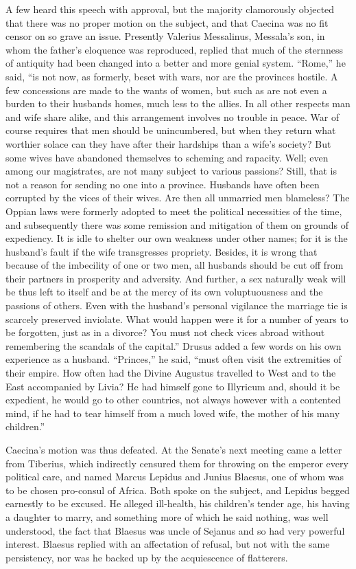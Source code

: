 A few heard this speech with approval, but the majority clamorously objected that there was no proper motion on the subject, and that Caecina was no fit censor on so grave an issue. Presently Valerius Messalinus, Messala's son, in whom the father's eloquence was reproduced, replied that much of the sternness of antiquity had been changed into a better and more genial system. ``Rome,'' he said, ``is not now, as formerly, beset with wars, nor are the provinces hostile. A few concessions are made to the wants of women, but such as are not even a burden to their husbands homes, much less to the allies. In all other respects man and wife share alike, and this arrangement involves no trouble in peace. War of course requires that men should be unincumbered, but when they return what worthier solace can they have after their hardships than a wife's society? But some wives have abandoned themselves to scheming and rapacity. Well; even among our magistrates, are not many subject to various passions? Still, that is not a reason for sending no one into a province. Husbands have often been corrupted by the vices of their wives. Are then all unmarried men blameless? The Oppian laws were formerly adopted to meet the political necessities of the time, and subsequently there was some remission and mitigation of them on grounds of expediency. It is idle to shelter our own weakness under other names; for it is the husband's fault if the wife transgresses propriety. Besides, it is wrong that because of the imbecility of one or two men, all husbands should be cut off from their partners in prosperity and adversity. And further, a sex naturally weak will be thus left to itself and be at the mercy of its own voluptuousness and the passions of others. Even with the husband's personal vigilance the marriage tie is scarcely preserved inviolate. What would happen were it for a number of years to be forgotten, just as in a divorce? You must not check vices abroad without remembering the scandals of the capital.'' Drusus added a few words on his own experience as a husband. ``Princes,'' he said, ``must often visit the extremities of their empire. How often had the Divine Augustus travelled to West and to the East accompanied by Livia? He had himself gone to Illyricum and, should it be expedient, he would go to other countries, not always however with a contented mind, if he had to tear himself from a much loved wife, the mother of his many children.''


Caecina's motion was thus defeated. At the Senate's next meeting came a letter from Tiberius, which indirectly censured them for throwing on the emperor every political care, and named Marcus Lepidus and Junius Blaesus, one of whom was to be chosen pro-consul of Africa. Both spoke on the subject, and Lepidus begged earnestly to be excused. He alleged ill-health, his children's tender age, his having a daughter to marry, and something more of which he said nothing, was well understood, the fact that Blaesus was uncle of Sejanus and so had very powerful interest. Blaesus replied with an affectation of refusal, but not with the same persistency, nor was he backed up by the acquiescence of flatterers.

